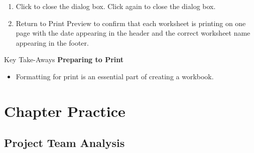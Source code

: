 \begin{enumerate}[resume]	
	\item Click  to close the  dialog box. 
	Click  again to close the  dialog box.
	\item Return to Print Preview to confirm that each worksheet is printing on one page with the date appearing in the header and the correct worksheet name appearing in the footer.
\end{enumerate}

\begin{center}
	\begin{tkwbox}{Key Take-Aways}
		\textbf{Preparing to Print}
		\\
		\begin{itemize}
			\setlength{\itemsep}{0pt}
			\setlength{\parskip}{0pt}
			\setlength{\parsep}{0pt}
			
			\item Formatting for print is an essential part of creating a workbook.
			
		\end{itemize}
	\end{tkwbox}
\end{center}

\section{Chapter Practice}

\subsection{Project Team Analysis}

